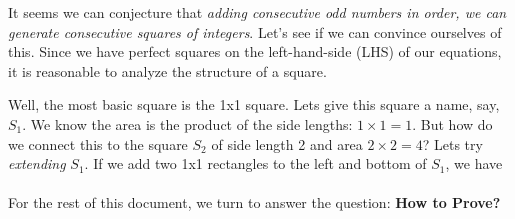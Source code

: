 \documentclass[../proofs.tex]{subfiles}
\begin{document}
It seems we can conjecture that \emph{adding consecutive odd numbers in order, we can generate
consecutive squares of integers}. Let's see if we can convince ourselves of this. Since we have
perfect squares on the left-hand-side (LHS) of our equations, it is reasonable to analyze the
structure of a square. 

Well, the most basic square is the 1x1 square. Lets give this square a name, say, $S_1$. 
We know the area is the product of the side lengths: 
$1 \times 1 = 1$. But how do we connect this to the square $S_2$ of side length 2 and area
$2 \times 2 = 4$? Lets try \emph{extending} $S_1$. If we add two 1x1 rectangles to the left and
bottom of $S_1$, we have






\paragraph{} For the rest of this document, we turn to answer the question:
\textbf{How to Prove?}
\end{document}
